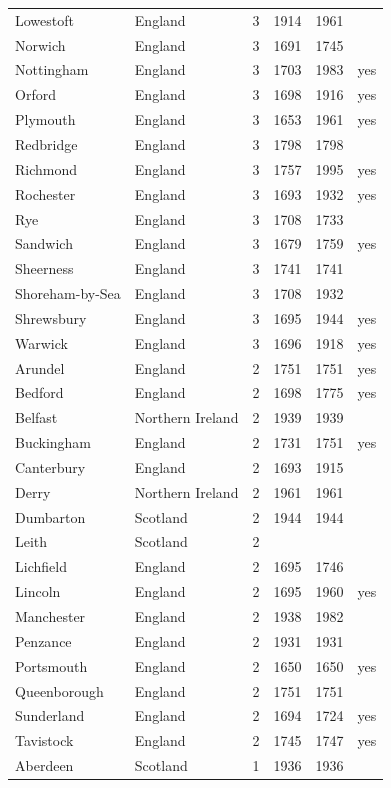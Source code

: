 \documentclass[11pt,a4paper]{article}
\begin{document}
{\begin{longtable}{llrrrl}
Lowestoft & England & 3 & 1914 & 1961 & \\
Norwich & England & 3 & 1691 & 1745 & \\
Nottingham & England & 3 & 1703 & 1983 & yes\\
Orford & England & 3 & 1698 & 1916 & yes\\
Plymouth & England & 3 & 1653 & 1961 & yes\\
Redbridge & England & 3 & 1798 & 1798 & \\
Richmond & England & 3 & 1757 & 1995 & yes\\
Rochester & England & 3 & 1693 & 1932 & yes\\
Rye & England & 3 & 1708 & 1733 & \\
Sandwich & England & 3 & 1679 & 1759 & yes\\
Sheerness & England & 3 & 1741 & 1741 & \\
Shoreham-by-Sea & England & 3 & 1708 & 1932 & \\
Shrewsbury & England & 3 & 1695 & 1944 & yes\\
Warwick & England & 3 & 1696 & 1918 & yes\\
Arundel & England & 2 & 1751 & 1751 & yes\\
Bedford & England & 2 & 1698 & 1775 & yes\\
Belfast & Northern Ireland & 2 & 1939 & 1939 & \\
Buckingham & England & 2 & 1731 & 1751 & yes\\
Canterbury & England & 2 & 1693 & 1915 & \\
Derry & Northern Ireland & 2 & 1961 & 1961 & \\
Dumbarton & Scotland & 2 & 1944 & 1944 & \\
Leith & Scotland & 2 &  &  & \\
Lichfield & England & 2 & 1695 & 1746 & \\
Lincoln & England & 2 & 1695 & 1960 & yes\\
Manchester & England & 2 & 1938 & 1982 & \\
Penzance & England & 2 & 1931 & 1931 & \\
Portsmouth & England & 2 & 1650 & 1650 & yes\\
Queenborough & England & 2 & 1751 & 1751 & \\
Sunderland & England & 2 & 1694 & 1724 & yes\\
Tavistock & England & 2 & 1745 & 1747 & yes\\
Aberdeen & Scotland & 1 & 1936 & 1936 & \\

\end{longtable}}
\end{document}
